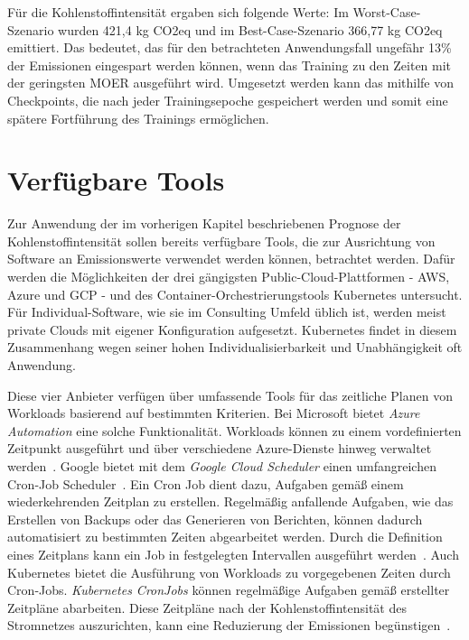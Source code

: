 \noindent Für die Kohlenstoffintensität ergaben sich folgende Werte:
Im Worst-Case-Szenario wurden 421,4 kg \ac{CO2}eq und im Best-Case-Szenario 366,77 kg \ac{CO2}eq emittiert.
Das bedeutet, das für den betrachteten Anwendungsfall ungefähr 13\% der Emissionen eingespart werden können, wenn das Training zu den Zeiten mit der geringsten \ac{MOER} ausgeführt wird.
Umgesetzt werden kann das mithilfe von Checkpoints, die nach jeder Trainingsepoche gespeichert werden und somit eine spätere Fortführung des Trainings ermöglichen.


\section{Verfügbare Tools}\label{CAP:tools}
Zur Anwendung der im vorherigen Kapitel beschriebenen Prognose der Kohlenstoffintensität sollen bereits verfügbare Tools, die zur Ausrichtung von Software an Emissionswerte verwendet werden können, betrachtet werden.
Dafür werden die Möglichkeiten der drei gängigsten Public-Cloud-Plattformen - \ac{AWS}, Azure und \ac{GCP} - und des Container-Orchestrierungstools Kubernetes untersucht.
Für Individual-Software, wie sie im Consulting Umfeld üblich ist, werden meist private Clouds mit eigener Konfiguration aufgesetzt.
Kubernetes findet in diesem Zusammenhang wegen seiner hohen Individualisierbarkeit und Unabhängigkeit oft Anwendung.

Diese vier Anbieter verfügen über umfassende Tools für das zeitliche Planen von Workloads basierend auf bestimmten Kriterien.
Bei Microsoft bietet \textit{Azure Automation} eine solche Funktionalität.
Workloads können zu einem vordefinierten Zeitpunkt ausgeführt und über verschiedene Azure-Dienste hinweg verwaltet werden~\cite{Microsoft.2022}.
Google bietet mit dem \textit{Google Cloud Scheduler} einen umfangreichen Cron-Job Scheduler~\cite{Google.2023b}.
Ein Cron Job dient dazu, Aufgaben gemäß einem wiederkehrenden Zeitplan zu erstellen.
Regelmäßig anfallende Aufgaben, wie das Erstellen von Backups oder das Generieren von Berichten, können dadurch automatisiert zu bestimmten Zeiten abgearbeitet werden.
Durch die Definition eines Zeitplans kann ein Job in festgelegten Intervallen ausgeführt werden~\cite{TheKubernetesAuthors.20240119T14:53:20+01:00}.
Auch Kubernetes bietet die Ausführung von Workloads zu vorgegebenen Zeiten durch Cron-Jobs.
\textit{Kubernetes CronJobs} können regelmäßige Aufgaben gemäß erstellter Zeitpläne abarbeiten.
Diese Zeitpläne nach der Kohlenstoffintensität des Stromnetzes auszurichten, kann eine Reduzierung der Emissionen begünstigen~\cite{TheKubernetesAuthors.20240119T14:53:20+01:00}.

